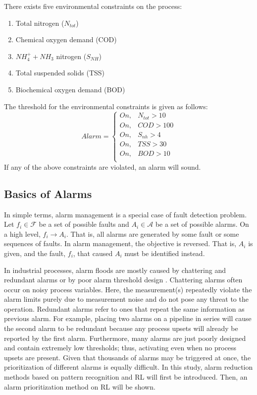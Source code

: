 There exists five environmental constraints on the process:
\begin{enumerate}
    \item Total nitrogen ($N_{tot}$)
    \item Chemical oxygen demand (COD)
    \item $NH_4^+ + NH_3$ nitrogen ($S_{NH}$)
    \item Total suspended solids (TSS)
    \item Biochemical oxygen demand (BOD)
\end{enumerate}
The threshold for the environmental constraints is given as follows:
\begin{equation}
    Alarm = 
    \begin{cases}
    On,              & N_{tot}  > 10 \\
    On,              & COD  >  100 \\
    On,              & S_{nh} >  4 \\
    On,              & TSS > 30 \\
    On,              & BOD > 10 \\
    \end{cases}
    \label{eq:03constraints}
\end{equation}
If any of the above constraints are violated, an alarm will sound.

\subsection{Basics of Alarms}
In simple terms, alarm management is a special case of fault detection problem. Let $f_i \in \mathcal{F}$ be a set of possible faults and $A_i \in \mathcal{A}$ be a set of possible alarms.  On a high level, $f_i \rightarrow A_i$.  That is, all alarms are generated by some fault or some sequences of faults. In alarm management, the objective is reversed.  That is, $A_i$ is given, and the fault, $f_i$, that caused $A_i$ must be identified instead.

In industrial processes, alarm floods are mostly caused by chattering and redundant alarms or by poor alarm threshold design \cite{alarm_manage}. Chattering alarms often occur on noisy process variables. Here, the measurement(s) repeatedly violate the alarm limits purely due to measurement noise and do not pose any threat to the operation.  Redundant alarms refer to ones that repeat the same information as previous alarm.  For example, placing two alarms on a pipeline in series will cause the second alarm to be redundant because any process upsets will already be reported by the first alarm. Furthermore, many alarms are just poorly designed and contain extremely low thresholds; thus, activating even when no process upsets are present.  Given that thousands of alarms may be triggered at once, the prioritization of different alarms is equally difficult.  In this study, alarm reduction methods based on pattern recognition and RL will first be introduced.  Then, an alarm prioritization method on RL will be shown.

